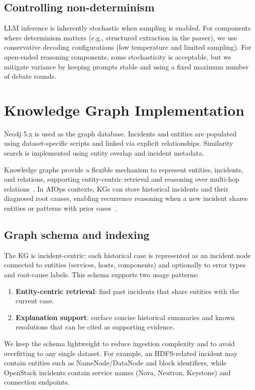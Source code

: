 \subsection{Controlling non-determinism}
LLM inference is inherently stochastic when sampling is enabled. For components where determinism
matters (e.g., structured extraction in the parser), we use conservative decoding configurations
(low temperature and limited sampling). For open-ended reasoning components, some stochasticity is
acceptable, but we mitigate variance by keeping prompts stable and using a fixed maximum number of
debate rounds.

\section{Knowledge Graph Implementation}
Neo4j 5.x is used as the graph database. Incidents and entities are populated using
dataset-specific scripts and linked via explicit relationships. Similarity search is implemented
using entity overlap and incident metadata.

Knowledge graphs provide a flexible mechanism to represent entities, incidents, and relations,
supporting entity-centric retrieval and reasoning over multi-hop
relations~\cite{hogan2021knowledge}. In AIOps contexts, KGs can store historical incidents and
their diagnosed root causes, enabling recurrence reasoning when a new incident shares entities or
patterns with prior cases~\cite{cui2025aetherlog}.

\subsection{Graph schema and indexing}
The KG is incident-centric: each historical case is represented as an incident node connected to
entities (services, hosts, components) and optionally to error types and root-cause labels. This
schema supports two usage patterns:
\begin{enumerate}
  \item \textbf{Entity-centric retrieval}: find past incidents that share entities with the
        current case.
  \item \textbf{Explanation support}: surface concise historical summaries and known resolutions
        that can be cited as supporting evidence.
\end{enumerate}

We keep the schema lightweight to reduce ingestion complexity and to avoid overfitting to any
single dataset. For example, an HDFS-related incident may contain entities such as
NameNode/DataNode and block identifiers, while OpenStack incidents contain service names (Nova,
Neutron, Keystone) and connection endpoints.

